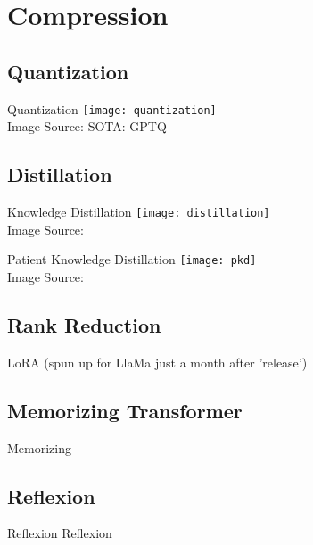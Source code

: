 \section{Compression}
\subsection{Quantization}
\begin{frame}[c]{Quantization}
    \texttt{[image: quantization]} \\
    Image Source: \cite{seo_efficient_2019}
    \large
    SOTA: GPTQ \cite{frantar_gptq_2022}
\end{frame}

\subsection{Distillation}
\begin{frame}[c]{Knowledge Distillation}
    \texttt{[image: distillation]} \\
    Image Source: \cite{gou_knowledge_2021}
\end{frame}
\begin{frame}[c]{Patient Knowledge Distillation}
    \texttt{[image: pkd]} \\
    Image Source: \cite{sun_patient_2019}
\end{frame}

\subsection{Rank Reduction}
\begin{frame}[c]
    LoRA \cite{hu_lora_2021}
    (spun up for LlaMa just a month after 'release')
\end{frame}

\subsection{Memorizing Transformer}
\begin{frame}[c]
    Memorizing \cite{wu_memorizing_2022}
\end{frame}

\subsection{Reflexion}
\begin{frame}[c]{Reflexion}
    Reflexion \cite{rombach_highresolution_2022}
\end{frame}

